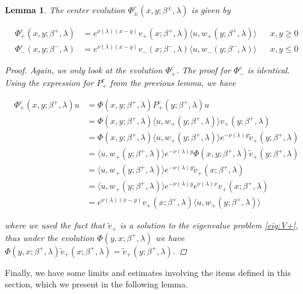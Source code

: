\documentclass[12pt]{article}
\newtheorem{lemma}{Lemma}
\begin{document}
\begin{lemma}

The center evolution $\Phi^c_\pm(x,y; \beta^\pm, \lambda)$ is given by

\begin{align}\label{Phic}
\Phi^c_+(x,y; \beta^+, \lambda) &= e^{\nu(\lambda)(x-y)} v_+(x; \beta^+, \lambda) \langle u, w_+(y; \beta^+, \lambda) \rangle && x, y \geq 0 \\
\Phi^c_-(x,y; \beta^-, \lambda) &= e^{\nu(\lambda)(x-y)} v_-(x; \beta^-, \lambda) \langle u, w_-(y; \beta^-, \lambda) \rangle && x, y \leq 0
\end{align}

\begin{proof}

Again, we only look at the evolution $\Phi^c_+$. The proof for $\Phi^c_-$ is identical. Using the expression for $P^c_+$ from the previous lemma, we have

\begin{align*}
\Phi^c_+(x,y; \beta^+, \lambda)u &= \Phi(x,y; \beta^+, \lambda) P^c_+(y; \beta^+, \lambda) u \\
&= \Phi(x,y; \beta^+, \lambda) \langle u, w_+(y; \beta^+, \lambda) \rangle v_+(y; \beta^+, \lambda) \\
&= \Phi(x,y; \beta^+, \lambda) \langle u, w_+(y; \beta^+, \lambda) \rangle e^{-\nu(\lambda)y} \tilde{v}_+(y; \beta^+, \lambda) \\
&= \langle u, w_+(y; \beta^+, \lambda) \rangle e^{-\nu(\lambda)y} \Phi(x,y; \beta^+, \lambda) \tilde{v}_+(y; \beta^+, \lambda) \\
&= \langle u, w_+(y; \beta^+, \lambda) \rangle e^{-\nu(\lambda)y} \tilde{v}_+(x; \beta^+, \lambda) \\
&= \langle u, w_+(y; \beta^+, \lambda) \rangle e^{-\nu(\lambda)y} e^{\nu(\lambda)x} v_+(x; \beta^+, \lambda) \\
&= e^{\nu(\lambda)(x-y)} v_+(x; \beta^+, \lambda) \langle u, w_+(y; \beta^+, \lambda) \rangle 
\end{align*}

where we used the fact that $\tilde{v}_+$ is a solution to the eigenvalue problem \eqref{eig:V+}, thus under the evolution $\Phi(y, x; \beta^+, \lambda)$ we have $\Phi(y, x; \beta^+, \lambda)\tilde{v}_+(x; \beta^+, \lambda) = \tilde{v}_+(y; \beta^+, \lambda)$.
\end{proof}
\end{lemma}

Finally, we have some limits and estimates involving the items defined in this section, which we present in the following lemma.
\end{document}
